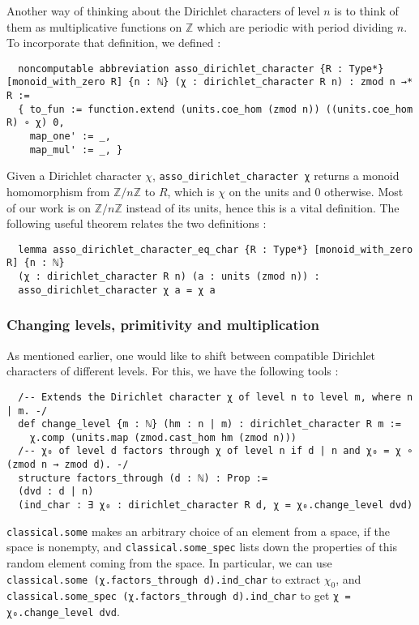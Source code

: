 \documentclass[a4paper,UKenglish,cleveref, autoref, thm-restate]{lipics-v2021}
\newcommand{\lean}[1]{\texttt{#1}\xspace} %
\begin{document}
Another way of thinking about the Dirichlet characters of level $n$ is to think of them as multiplicative functions on $\mathbb{Z}$ 
which are periodic with period dividing $n$. To incorporate that definition, we defined : 
\begin{lstlisting}
  noncomputable abbreviation asso_dirichlet_character {R : Type*} [monoid_with_zero R] {n : ℕ} (χ : dirichlet_character R n) : zmod n →* R :=
  { to_fun := function.extend (units.coe_hom (zmod n)) ((units.coe_hom R) ∘ χ) 0,
    map_one' := _,
    map_mul' := _, }
\end{lstlisting}

Given a Dirichlet character $\chi$, \lean{asso\_dirichlet\_character χ} returns a monoid homomorphism from $\mathbb{Z}/n \mathbb{Z}$ 
to $R$, which is $\chi$ on the units and 0 otherwise. Most of our work is on $\mathbb{Z}/n \mathbb{Z}$ instead of its units, hence this 
is a vital definition. The following useful theorem relates the two definitions :
\begin{lstlisting}
  lemma asso_dirichlet_character_eq_char {R : Type*} [monoid_with_zero R] {n : ℕ}
  (χ : dirichlet_character R n) (a : units (zmod n)) : 
  asso_dirichlet_character χ a = χ a 
\end{lstlisting}

\subsubsection{Changing levels, primitivity and multiplication}
As mentioned earlier, one would like to shift between compatible Dirichlet characters of different levels. For this, we have the following tools : 
\begin{lstlisting}
  /-- Extends the Dirichlet character χ of level n to level m, where n | m. -/
  def change_level {m : ℕ} (hm : n | m) : dirichlet_character R m :=
    χ.comp (units.map (zmod.cast_hom hm (zmod n)))
  /-- χ₀ of level d factors through χ of level n if d | n and χ₀ = χ ∘ (zmod n → zmod d). -/
  structure factors_through (d : ℕ) : Prop :=
  (dvd : d | n)
  (ind_char : ∃ χ₀ : dirichlet_character R d, χ = χ₀.change_level dvd)
\end{lstlisting}

\lean{classical.some} makes an arbitrary choice of an element from a space, if the space
is nonempty, and \lean{classical.some\_spec} lists down the properties of this random element
coming from the space. In particular, we can use \lean{classical.some (χ.factors\_through d).ind\_char} 
to extract $\chi_0$, and \lean{classical.some\_spec (χ.factors\_through d).ind\_char} to get 
\lean{χ = χ₀.change\_level dvd}.
\end{document}
